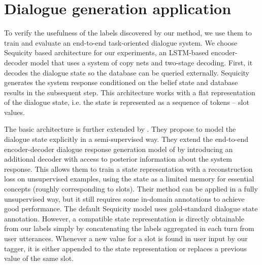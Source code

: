 
\section{Dialogue generation application}
To verify the usefulness of the labels discovered by our method, we use them to train and evaluate an end-to-end task-oriented dialogue system.
We choose Sequicity \cite{lei2018sequicity} based architecture for our experiments, an LSTM-based encoder-decoder model that uses a system of copy nets and two-stage decoding.
First, it decodes the dialogue state so the database can be queried externally.
Sequicity generates the system response conditioned on the belief state and database results in the subsequent step.
This architecture works with a flat representation of the dialogue state, i.e. the state is represented as a sequence of tokens -- slot values.

The basic architecture is further extended by \citet{jin2018explicit}.
They propose to model the dialogue state explicitly in a semi-supervised way.
They extend the end-to-end encoder-decoder dialogue response generation model of \citet{lei2018sequicity} by introducing an additional decoder with access to posterior information about the system response.
This allows them to train a state representation with a reconstruction loss on unsupervised examples, using the state as a limited memory for essential concepts (roughly corresponding to slots).
Their method can be applied in a fully unsupervised way, but it still requires some in-domain annotations to achieve good performance.
The default Sequicity model uses gold-standard dialogue state annotation. However, a compatible state representation is directly obtainable from our labels simply by concatenating the labels aggregated in each turn from user utterances. Whenever a new value for a slot is found in user input by our tagger, it is either appended to the state representation or replaces a previous value of the same slot.

